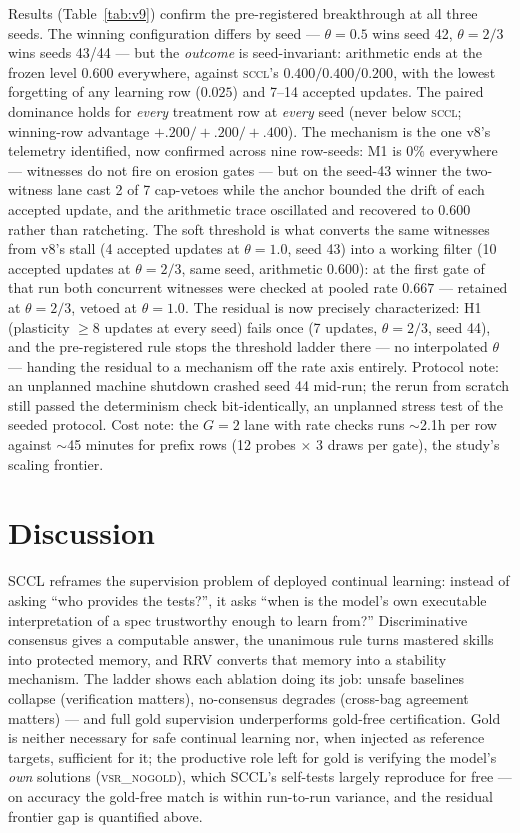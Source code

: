 \documentclass[10pt,conference]{IEEEtran}
\begin{document}
Results (Table~\ref{tab:v9}) confirm the pre-registered breakthrough at all three seeds. The winning configuration differs by seed --- $\theta{=}0.5$ wins seed 42, $\theta{=}2/3$ wins seeds 43/44 --- but the \emph{outcome} is seed-invariant: arithmetic ends at the frozen level $0.600$ everywhere, against \textsc{sccl}'s $0.400/0.400/0.200$, with the lowest forgetting of any learning row ($0.025$) and 7--14 accepted updates. The paired dominance holds for \emph{every} treatment row at \emph{every} seed (never below \textsc{sccl}; winning-row advantage $+.200/+.200/+.400$). The mechanism is the one v8's telemetry identified, now confirmed across nine row-seeds: M1 is $0\%$ everywhere --- witnesses do not fire on erosion gates --- but on the seed-43 winner the two-witness lane cast 2 of 7 cap-vetoes while the anchor bounded the drift of each accepted update, and the arithmetic trace oscillated and recovered to $0.600$ rather than ratcheting. The soft threshold is what converts the same witnesses from v8's stall (4 accepted updates at $\theta{=}1.0$, seed 43) into a working filter (10 accepted updates at $\theta{=}2/3$, same seed, arithmetic $0.600$): at the first gate of that run both concurrent witnesses were checked at pooled rate $0.667$ --- retained at $\theta{=}2/3$, vetoed at $\theta{=}1.0$. The residual is now precisely characterized: H1 (plasticity $\geq8$ updates at every seed) fails once (7 updates, $\theta{=}2/3$, seed 44), and the pre-registered rule stops the threshold ladder there --- no interpolated $\theta$ --- handing the residual to a mechanism off the rate axis entirely. Protocol note: an unplanned machine shutdown crashed seed 44 mid-run; the rerun from scratch still passed the determinism check bit-identically, an unplanned stress test of the seeded protocol. Cost note: the $G{=}2$ lane with rate checks runs $\sim$2.1h per row against $\sim$45 minutes for prefix rows (12 probes $\times$ 3 draws per gate), the study's scaling frontier.

\section{Discussion}
SCCL reframes the supervision problem of deployed continual learning: instead of asking ``who provides the tests?'', it asks ``when is the model's own executable interpretation of a spec trustworthy enough to learn from?'' Discriminative consensus gives a computable answer, the unanimous rule turns mastered skills into protected memory, and RRV converts that memory into a stability mechanism. The ladder shows each ablation doing its job: unsafe baselines collapse (verification matters), no-consensus degrades (cross-bag agreement matters) --- and full gold supervision underperforms gold-free certification. Gold is neither necessary for safe continual learning nor, when injected as reference targets, sufficient for it; the productive role left for gold is verifying the model's \emph{own} solutions (\textsc{vsr\_nogold}), which SCCL's self-tests largely reproduce for free --- on accuracy the gold-free match is within run-to-run variance, and the residual frontier gap is quantified above.
\end{document}

